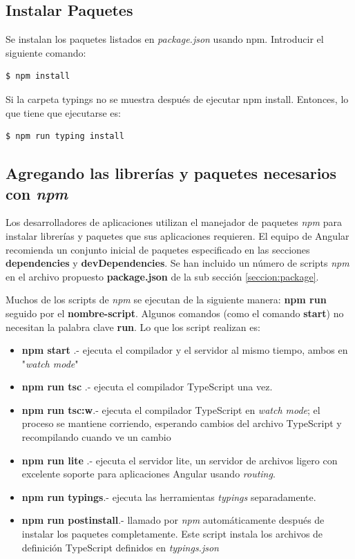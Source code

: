 \documentclass[12pt,twoside]{book}
\begin{document}
\subsection{Instalar Paquetes }

Se instalan los paquetes listados en \emph{package.json} usando npm. Introducir el siguiente comando:

\begin{lstlisting}[language=bash]
$ npm install
\end{lstlisting}

Si la carpeta typings no se muestra  después de ejecutar npm install. Entonces, lo que tiene que ejecutarse es:

\begin{lstlisting}[language=bash]
$ npm run typing install
\end{lstlisting}

\subsection{Agregando las librerías y paquetes necesarios con \emph{npm}}

Los desarrolladores de aplicaciones utilizan el manejador de paquetes \emph{npm} para instalar librerías y paquetes que sus aplicaciones requieren. El equipo de Angular recomienda un conjunto inicial de paquetes especificado en las secciones \textbf{dependencies} y \textbf{devDependencies}.  Se han incluido un número de scripts \emph{npm} en el archivo propuesto \textbf{package.json} de la sub sección \ref{seccion:package}.

Muchos de los scripts de \emph{npm} se ejecutan de la siguiente manera: \textbf{npm run} seguido por el \textbf{nombre-script}. Algunos comandos (como el comando \textbf{start}) no necesitan la palabra clave \textbf{run}. Lo que los script realizan es:

\begin{itemize}
\item \textbf{npm start} .- ejecuta el compilador y el servidor al mismo tiempo, ambos en "\emph{watch mode}"
\item \textbf{npm run tsc} .- ejecuta el compilador TypeScript una vez.
\item \textbf{npm run tsc:w}.-  ejecuta el compilador TypeScript en \emph{watch mode}; el proceso se mantiene corriendo, esperando cambios del archivo TypeScript y recompilando cuando ve un cambio
\item \textbf{npm run lite} .- ejecuta el servidor lite, un servidor de archivos ligero con excelente soporte para aplicaciones Angular usando \textit{routing}.
 \item \textbf{npm run typings}.- ejecuta las herramientas \textit{typings} separadamente.
\item \textbf{npm run postinstall}.- llamado por \textit{npm} automáticamente después de instalar los paquetes completamente. Este script instala los archivos de definición TypeScript definidos en \emph{typings.json} 
\end{itemize}
\end{document}
